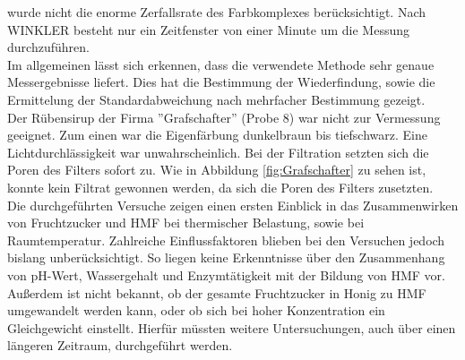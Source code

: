 wurde nicht die enorme Zerfallsrate des Farbkomplexes berücksichtigt. 
Nach WINKLER besteht nur ein Zeitfenster von einer Minute um die Messung durchzuführen.~\cite{Winkler}\\
Im allgemeinen lässt sich erkennen, dass die verwendete Methode sehr genaue Messergebnisse liefert. Dies hat die Bestimmung der Wiederfindung, sowie die Ermittelung der Standardabweichung nach mehrfacher Bestimmung gezeigt.\\
Der Rübensirup der Firma ''Grafschafter'' (Probe 8) war nicht zur Vermessung geeignet. Zum einen war die Eigenfärbung dunkelbraun bis tiefschwarz. Eine Lichtdurchlässigkeit war unwahrscheinlich. Bei der Filtration setzten sich die Poren des Filters sofort zu. Wie in Abbildung \ref{fig:Grafschafter} zu sehen ist, konnte kein Filtrat gewonnen werden, da sich die Poren des Filters zusetzten.\\
Die durchgeführten Versuche zeigen einen ersten Einblick in das Zusammenwirken von Fruchtzucker und HMF bei thermischer Belastung, sowie bei Raumtemperatur. Zahlreiche Einflussfaktoren blieben bei den Versuchen jedoch bislang unberücksichtigt. So liegen keine Erkenntnisse über den Zusammenhang von pH-Wert, Wassergehalt und Enzymtätigkeit mit der Bildung von HMF vor. Außerdem ist nicht bekannt, ob der gesamte Fruchtzucker in Honig zu HMF umgewandelt werden kann, oder ob sich bei hoher Konzentration ein Gleichgewicht einstellt. Hierfür müssten weitere Untersuchungen, auch über einen längeren Zeitraum, durchgeführt werden.
